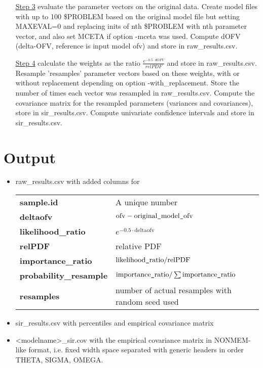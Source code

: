 \begin{itemize}
\item[\underline{Step 3}] evaluate the parameter vectors on the original data.
Create model files with up to 100 \$PROBLEM based on the original model file but setting MAXEVAL=0
and replacing inits of nth \$PROBLEM with nth parameter vector, and also set MCETA if option -mceta was used. Compute dOFV 
(delta-OFV, reference is input model ofv) and store in raw\_results.csv.
\item[\underline{Step 4}] calculate the weights as the ratio $\frac{e^{-0.5\cdot dOFV}}{relPDF}$ and store in raw\_results.csv. 
Resample 'resamples' parameter vectors based on these weights, with or without replacement depending on option -with\_replacement. 
Store the number of times each vector was resampled in raw\_results.csv.
Compute the covariance matrix for the resampled parameters (variances and covariances), 
store in sir\_results.csv. 
Compute univariate confidence intervals and store in sir\_results.csv.
\end{itemize}

\section{Output}
\begin{itemize}
\item raw\_results.csv with added columns for\\
\begin{tabular}{ll}
\bf{sample.id} & A unique number\\
\bf{deltaofv} & $\mathrm{ofv} - \mathrm{original}\mbox{\tt\string_}\mathrm{model}\mbox{\tt\string_}\mathrm{ofv}$\\
\bf{likelihood\_ratio} & $e^{-0.5\cdot \mathrm{deltaofv}}$ \\
\bf{relPDF} & relative PDF \\
\bf{importance\_ratio} & $\mathrm{likelihood}\mbox{\tt\string_}\mathrm{ratio}/\mathrm{relPDF}$\\
\bf{probability\_resample} & $\mathrm{importance}\mbox{\tt\string_}\mathrm{ratio}/\sum{\mathrm{importance}\mbox{\tt\string_}\mathrm{ratio}}$ \\
\bf{resamples} & number of actual resamples with random seed used\\
\end{tabular}
\item sir\_results.csv with percentiles and empirical covariance matrix
\item <modelname>\_sir.cov with the empirical covariance matrix in NONMEM-like format, i.e. 
      fixed width space separated with generic headers in order THETA, SIGMA, OMEGA.
\end{itemize}



